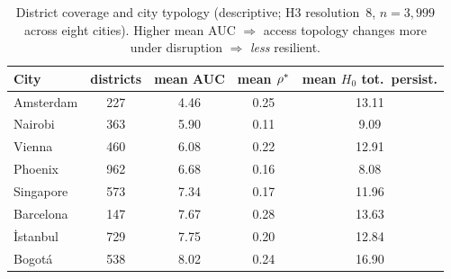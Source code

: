 \begin{table}[t]\centering
\caption{District coverage and city typology (descriptive; H3 resolution~8,
$n=3{,}999$ across eight cities). Higher mean AUC $\Rightarrow$ access topology
changes more under disruption $\Rightarrow$ \emph{less} resilient.}
\label{tab:typology}
\begin{tabular}{lcccc}
\toprule
City & districts & mean AUC & mean $\rho^{*}$ & mean $H_0$ tot.\ persist.\\
\midrule
Amsterdam & 227 & 4.46 & 0.25 & 13.11\\
Nairobi   & 363 & 5.90 & 0.11 & 9.09\\
Vienna    & 460 & 6.08 & 0.22 & 12.91\\
Phoenix   & 962 & 6.68 & 0.16 & 8.08\\
Singapore & 573 & 7.34 & 0.17 & 11.96\\
Barcelona & 147 & 7.67 & 0.28 & 13.63\\
İstanbul  & 729 & 7.75 & 0.20 & 12.84\\
Bogotá    & 538 & 8.02 & 0.24 & 16.90\\
\bottomrule
\end{tabular}
\end{table}

